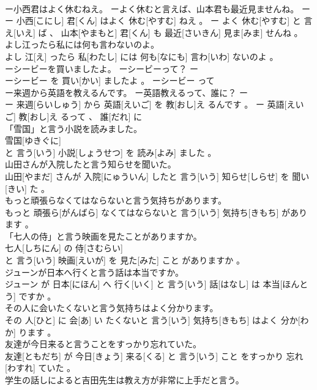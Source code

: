 \documentclass[8pt]{extreport}
\begin{document}
\begin{CJK}{UTF8}{min}
\\	ー小西君はよく休むねえ。 ーよく休むと言えば、山本君も最近見ませんね。	ー
\\	ー 小西[こにし] 君[くん] はよく 休む[やすむ] ねえ 。 ー よく 休む[やすむ] と 言え[いえ] ば 、 山本[やまもと] 君[くん] も 最近[さいきん] 見ま[みま] せんね 。
\\	よし江ったら私には何も言わないのよ。	
\\	よし 江[え] ったら 私[わたし] には 何も[なにも] 言わ[いわ] ないのよ 。
\\	ーシービーを買いましたよ。 ーシービーって？	ー
\\	ーシービー を 買い[かい] ましたよ 。 ーシービー って 
\\	ー来週から英語を教えるんです。 ー英語教えるって、誰に？	ー
\\	ー 来週[らいしゅう] から 英語[えいご] を 教[おし]え るんです 。 ー 英語[えいご] 教[おし]え るって 、 誰[だれ] に 
\\	「雪国」と言う小説を読みました。	
\\	雪国[ゆきぐに] 
\\	と 言う[いう] 小説[しょうせつ] を 読み[よみ] ました 。
\\	山田さんが入院したと言う知らせを聞いた。	
\\	山田[やまだ] さんが 入院[にゅういん] したと 言う[いう] 知らせ[しらせ] を 聞い[きい] た 。
\\	もっと頑張らなくてはならないと言う気持ちがあります。	
\\	もっと 頑張ら[がんばら] なくてはならないと 言う[いう] 気持ち[きもち] があります 。
\\	「七人の侍」と言う映画を見たことがありますか。	
\\	七人[しちにん] の 侍[さむらい] 
\\	と 言う[いう] 映画[えいが] を 見た[みた] こと がありますか 。
\\	ジューンが日本へ行くと言う話は本当ですか。	
\\	ジューン が 日本[にほん] へ 行く[いく] と 言う[いう] 話[はなし] は 本当[ほんとう] ですか 。
\\	その人に会いたくないと言う気持ちはよく分かります。	
\\	その 人[ひと] に 会[あ] い たくないと 言う[いう] 気持ち[きもち] はよく 分か[わか] ります 。
\\	友達が今日来ると言うことをすっかり忘れていた。	
\\	友達[ともだち] が 今日[きょう] 来る[くる] と 言う[いう] こと をすっかり 忘れ[わすれ] ていた 。
\\	学生の話しによると吉田先生は教え方が非常に上手だと言う。	

\end{CJK}
\end{document}
